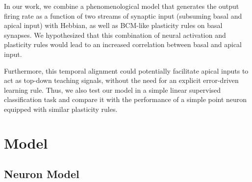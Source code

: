 \documentclass[utf8]{frontiersSCNS} %
\begin{document}
In our work, we combine a phenomenological model that 
generates the output firing rate as a function of two 
streams of synaptic input (subsuming basal and apical input)
with Hebbian, as well as BCM-like plasticity rules on basal synapses. 
We hypothesized that this combination of neural 
activation and plasticity rules would lead to an
increased correlation between basal and apical input.

Furthermore, this temporal alignment could potentially 
facilitate apical inputs to act as top-down teaching signals, 
without the need for an explicit error-driven
learning rule. Thus, we also test our model in a simple linear 
supervised classification task and compare it with 
the performance of a simple point neuron equipped with similar 
plasticity rules.

\section{Model}
\label{sect:model}

\subsection{Neuron Model}
\label{sect:neuronmodel}
\end{document}
